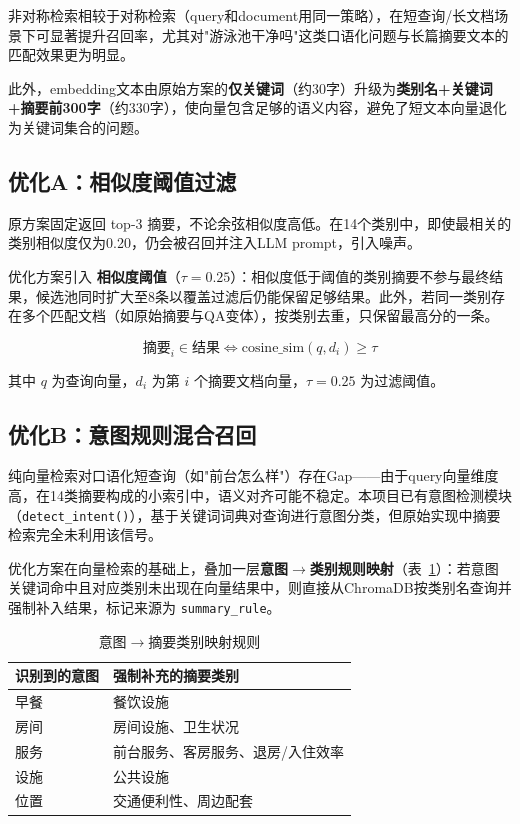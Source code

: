 \documentclass[11pt, a4paper]{article}
\begin{document}
非对称检索相较于对称检索（query和document用同一策略），在短查询/长文档场景下可显著提升召回率，尤其对"游泳池干净吗"这类口语化问题与长篇摘要文本的匹配效果更为明显。

此外，embedding文本由原始方案的\textbf{仅关键词}（约30字）升级为\textbf{类别名+关键词+摘要前300字}（约330字），使向量包含足够的语义内容，避免了短文本向量退化为关键词集合的问题。

\subsection{优化A：相似度阈值过滤}

原方案固定返回 top-3 摘要，不论余弦相似度高低。在14个类别中，即使最相关的类别相似度仅为0.20，仍会被召回并注入LLM prompt，引入噪声。

优化方案引入 \textbf{相似度阈值}（$\tau = 0.25$）：相似度低于阈值的类别摘要不参与最终结果，候选池同时扩大至8条以覆盖过滤后仍能保留足够结果。此外，若同一类别存在多个匹配文档（如原始摘要与QA变体），按类别去重，只保留最高分的一条。

$$
\text{摘要}_{i} \in \text{结果} \iff \text{cosine\_sim}(q, d_i) \geq \tau
$$

其中 $q$ 为查询向量，$d_i$ 为第 $i$ 个摘要文档向量，$\tau=0.25$ 为过滤阈值。

\subsection{优化B：意图规则混合召回}

纯向量检索对口语化短查询（如"前台怎么样"）存在Gap——由于query向量维度高，在14类摘要构成的小索引中，语义对齐可能不稳定。本项目已有意图检测模块（\texttt{detect\_intent()}），基于关键词词典对查询进行意图分类，但原始实现中摘要检索完全未利用该信号。

优化方案在向量检索的基础上，叠加一层\textbf{意图$\rightarrow$类别规则映射}（表~\ref{tab:rule}）：若意图关键词命中且对应类别未出现在向量结果中，则直接从ChromaDB按类别名查询并强制补入结果，标记来源为 \texttt{summary\_rule}。

\begin{table}[H]
\centering
\caption{意图$\rightarrow$摘要类别映射规则}
\label{tab:rule}
\setlength{\tabcolsep}{6pt}
\begin{tabular}{ll}
\toprule
\textbf{识别到的意图} & \textbf{强制补充的摘要类别} \\
\midrule
早餐 & 餐饮设施 \\
房间 & 房间设施、卫生状况 \\
服务 & 前台服务、客房服务、退房/入住效率 \\
设施 & 公共设施 \\
位置 & 交通便利性、周边配套 \\
\bottomrule
\end{tabular}
\end{table}
\end{document}
